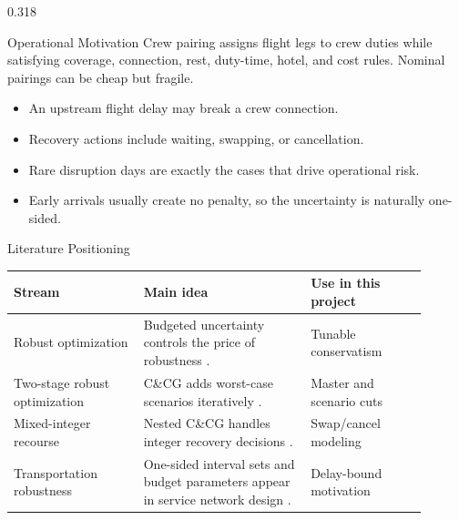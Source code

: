 \documentclass[final]{beamer}
\newcommand{\tightitem}{\setlength{\itemsep}{0.10em}\setlength{\parsep}{0pt}\setlength{\topsep}{0pt}}
\begin{document}
\begin{frame}[t]
\begin{minipage}[t]{0.968\textwidth}
\begin{columns}[t,totalwidth=\linewidth]
\begin{column}{0.318\linewidth}

\begin{block}{Operational Motivation}
Crew pairing assigns flight legs to crew duties while satisfying coverage, connection, rest, duty-time, hotel, and cost rules. Nominal pairings can be cheap but fragile.
\begin{itemize}\tightitem
  \item An upstream flight delay may break a crew connection.
  \item Recovery actions include waiting, swapping, or cancellation.
  \item Rare disruption days are exactly the cases that drive operational risk.
  \item Early arrivals usually create no penalty, so the uncertainty is naturally one-sided.
\end{itemize}
\begin{center}
\end{center}
\end{block}

\begin{block}{Literature Positioning}
\scriptsize
\renewcommand{\arraystretch}{1.18}
\begin{tabular}{p{0.29\linewidth}p{0.36\linewidth}p{0.25\linewidth}}
\toprule
\textbf{Stream} & \textbf{Main idea} & \textbf{Use in this project}\\
\midrule
Robust optimization & Budgeted uncertainty controls the price of robustness \cite{bertsimas2004}. & Tunable conservatism\\
Two-stage robust optimization & C\&CG adds worst-case scenarios iteratively \cite{zeng2013}. & Master and scenario cuts\\
Mixed-integer recourse & Nested C\&CG handles integer recovery decisions \cite{zhao2012}. & Swap/cancel modeling\\
Transportation robustness & One-sided interval sets and budget parameters appear in service network design \cite{wang2020}. & Delay-bound motivation\\
\bottomrule
\end{tabular}
\end{block}


\end{column}
\end{columns}
\end{minipage}
\end{frame}
\end{document}
